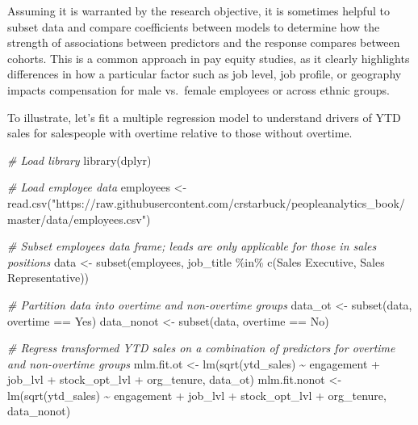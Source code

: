 \documentclass[
]{book}
\newenvironment{Shaded}{\begin{snugshade}}{\end{snugshade}}
\newcommand{\CommentTok}[1]{\textcolor[rgb]{0.56,0.35,0.01}{\textit{#1}}}
\newcommand{\FunctionTok}[1]{\textcolor[rgb]{0.00,0.00,0.00}{#1}}
\newcommand{\NormalTok}[1]{#1}
\newcommand{\OtherTok}[1]{\textcolor[rgb]{0.56,0.35,0.01}{#1}}
\newcommand{\SpecialCharTok}[1]{\textcolor[rgb]{0.00,0.00,0.00}{#1}}
\newcommand{\StringTok}[1]{\textcolor[rgb]{0.31,0.60,0.02}{#1}}
\begin{document}
Assuming it is warranted by the research objective, it is sometimes helpful to subset data and compare coefficients between models to determine how the strength of associations between predictors and the response compares between cohorts. This is a common approach in pay equity studies, as it clearly highlights differences in how a particular factor such as job level, job profile, or geography impacts compensation for male vs.~female employees or across ethnic groups.

To illustrate, let's fit a multiple regression model to understand drivers of YTD sales for salespeople with overtime relative to those without overtime.

\begin{Shaded}
\begin{Highlighting}[]
\CommentTok{\# Load library}
\FunctionTok{library}\NormalTok{(dplyr)}

\CommentTok{\# Load employee data}
\NormalTok{employees }\OtherTok{\textless{}{-}} \FunctionTok{read.csv}\NormalTok{(}\StringTok{"https://raw.githubusercontent.com/crstarbuck/peopleanalytics\_book/master/data/employees.csv"}\NormalTok{)}

\CommentTok{\# Subset employees data frame; leads are only applicable for those in sales positions}
\NormalTok{data }\OtherTok{\textless{}{-}} \FunctionTok{subset}\NormalTok{(employees, job\_title }\SpecialCharTok{\%in\%} \FunctionTok{c}\NormalTok{(}\StringTok{\textquotesingle{}Sales Executive\textquotesingle{}}\NormalTok{, }\StringTok{\textquotesingle{}Sales Representative\textquotesingle{}}\NormalTok{))}

\CommentTok{\# Partition data into overtime and non{-}overtime groups}
\NormalTok{data\_ot }\OtherTok{\textless{}{-}} \FunctionTok{subset}\NormalTok{(data, overtime }\SpecialCharTok{==} \StringTok{\textquotesingle{}Yes\textquotesingle{}}\NormalTok{)}
\NormalTok{data\_nonot }\OtherTok{\textless{}{-}} \FunctionTok{subset}\NormalTok{(data, overtime }\SpecialCharTok{==} \StringTok{\textquotesingle{}No\textquotesingle{}}\NormalTok{)}

\CommentTok{\# Regress transformed YTD sales on a combination of predictors for overtime and non{-}overtime groups}
\NormalTok{mlm.fit.ot }\OtherTok{\textless{}{-}} \FunctionTok{lm}\NormalTok{(}\FunctionTok{sqrt}\NormalTok{(ytd\_sales) }\SpecialCharTok{\textasciitilde{}}\NormalTok{ engagement }\SpecialCharTok{+}\NormalTok{ job\_lvl }\SpecialCharTok{+}\NormalTok{ stock\_opt\_lvl }\SpecialCharTok{+}\NormalTok{ org\_tenure, data\_ot)}
\NormalTok{mlm.fit.nonot }\OtherTok{\textless{}{-}} \FunctionTok{lm}\NormalTok{(}\FunctionTok{sqrt}\NormalTok{(ytd\_sales) }\SpecialCharTok{\textasciitilde{}}\NormalTok{ engagement }\SpecialCharTok{+}\NormalTok{ job\_lvl }\SpecialCharTok{+}\NormalTok{ stock\_opt\_lvl }\SpecialCharTok{+}\NormalTok{ org\_tenure, data\_nonot)}
\end{Highlighting}
\end{Shaded}
\end{document}
